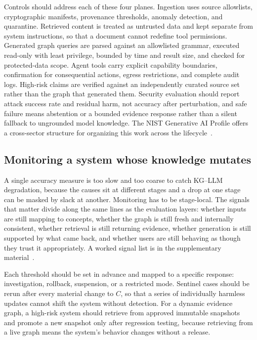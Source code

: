 Controls should address each of these four planes. Ingestion uses source allowlists, cryptographic manifests, provenance thresholds, anomaly detection, and quarantine. Retrieved content is treated as untrusted data and kept separate from system instructions, so that a document cannot redefine tool permissions. Generated graph queries are parsed against an allowlisted grammar, executed read-only with least privilege, bounded by time and result size, and checked for protected-data scope. Agent tools carry explicit capability boundaries, confirmation for consequential actions, egress restrictions, and complete audit logs. High-risk claims are verified against an independently curated source set rather than the graph that generated them. Security evaluation should report attack success rate and residual harm, not accuracy after perturbation, and safe failure means abstention or a bounded evidence response rather than a silent fallback to ungrounded model knowledge. The NIST Generative AI Profile offers a cross-sector structure for organizing this work across the lifecycle~\cite{nistgenai2024}.

\subsection{Monitoring a system whose knowledge mutates}

A single accuracy measure is too slow and too coarse to catch KG--LLM degradation, because the causes sit at different stages and a drop at one stage can be masked by slack at another. Monitoring has to be stage-local. The signals that matter divide along the same lines as the evaluation layers: whether inputs are still mapping to concepts, whether the graph is still fresh and internally consistent, whether retrieval is still returning evidence, whether generation is still supported by what came back, and whether users are still behaving as though they trust it appropriately. A worked signal list is in the supplementary material~\cite{supplementary}.

Each threshold should be set in advance and mapped to a specific response: investigation, rollback, suspension, or a restricted mode. Sentinel cases should be rerun after every material change to $C$, so that a series of individually harmless updates cannot shift the system without detection. For a dynamic evidence graph, a high-risk system should retrieve from approved immutable snapshots and promote a new snapshot only after regression testing, because retrieving from a live graph means the system's behavior changes without a release.

